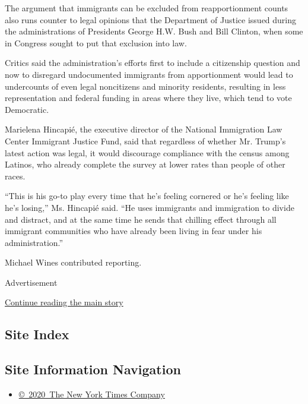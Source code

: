 The argument that immigrants can be excluded from reapportionment counts
also runs counter to legal opinions that the Department of Justice
issued during the administrations of Presidents George H.W. Bush and
Bill Clinton, when some in Congress sought to put that exclusion into
law.

Critics said the administration's efforts first to include a citizenship
question and now to disregard undocumented immigrants from apportionment
would lead to undercounts of even legal noncitizens and minority
residents, resulting in less representation and federal funding in areas
where they live, which tend to vote Democratic.

Marielena Hincapié, the executive director of the National Immigration
Law Center Immigrant Justice Fund, said that regardless of whether Mr.
Trump's latest action was legal, it would discourage compliance with the
census among Latinos, who already complete the survey at lower rates
than people of other races.

``This is his go-to play every time that he's feeling cornered or he's
feeling like he's losing,'' Ms. Hincapié said. ``He uses immigrants and
immigration to divide and distract, and at the same time he sends that
chilling effect through all immigrant communities who have already been
living in fear under his administration.''

Michael Wines contributed reporting.

Advertisement

\protect\hyperlink{after-bottom}{Continue reading the main story}

\hypertarget{site-index}{%
\subsection{Site Index}\label{site-index}}

\hypertarget{site-information-navigation}{%
\subsection{Site Information
Navigation}\label{site-information-navigation}}

\begin{itemize}
\tightlist
\item
  \href{https://help.nytimes3xbfgragh.onion/hc/en-us/articles/115014792127-Copyright-notice}{©~2020~The
  New York Times Company}
\end{itemize}

